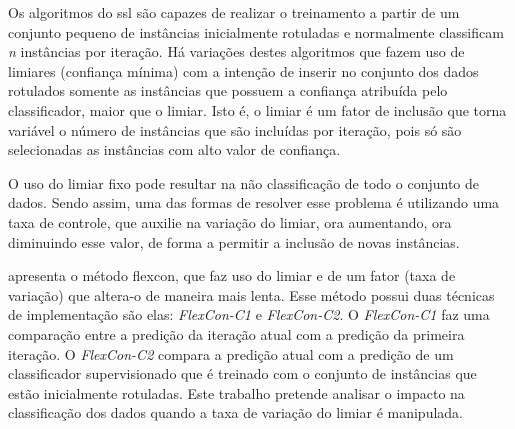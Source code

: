     
    Os algoritmos do \ac{ssl} são capazes de realizar o treinamento a partir de um conjunto pequeno de instâncias inicialmente rotuladas e normalmente classificam \textit{n} instâncias por iteração. Há variações destes algoritmos que fazem uso de limiares (confiança mínima) com a intenção de inserir no conjunto dos dados rotulados somente as instâncias que possuem a confiança atribuída pelo classificador, maior que o limiar. Isto é, o limiar é um fator de inclusão que torna variável o número de instâncias que são incluídas por iteração, pois só são selecionadas as instâncias com alto valor de confiança.
    
    
    O uso do limiar fixo pode resultar na não classificação de todo o conjunto de dados. Sendo assim, uma das formas de resolver esse problema é utilizando uma taxa de controle, que auxilie na variação do limiar, ora aumentando, ora diminuindo esse valor, de forma a permitir a inclusão de novas instâncias.
    
    
     apresenta o método \ac{flexcon}, que faz uso do limiar e de um fator (taxa de variação) que altera\hyp{o} de maneira mais lenta. Esse método possui duas técnicas de implementação são elas: \textit{FlexCon\hyp{C1}} e \textit{FlexCon\hyp{C2}}. O \textit{FlexCon\hyp{C1}} faz uma comparação entre a predição da iteração atual com a predição da primeira iteração. O \textit{FlexCon\hyp{C2}} compara a predição atual com a predição de um classificador supervisionado que é treinado com o conjunto de instâncias que estão inicialmente rotuladas. Este trabalho pretende analisar o impacto na classificação dos dados quando a taxa de variação do limiar é manipulada.
    
